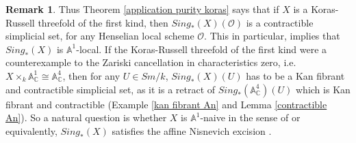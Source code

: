 \documentclass[11pt, reqno]{amsart}
\theoremstyle{plain}
\theoremstyle{definition}
\newtheorem{remark}[thm]{Remark}
\newcommand{\A}{{\mathbb A}}
\newcommand{\C}{{\mathbb C}}
\begin{document}


\begin{remark}
Thus Theorem \ref{application purity koras} says that if $X$ is a Koras-Russell threefold of the first kind, then $Sing_*(X)(\mathcal{O})$ is a contractible  simplicial set, for any Henselian local scheme $\mathcal{O}$.
This in particular, implies that $Sing_*(X)$
is $\mathbb{A}^1$-local.
If the Koras-Russell threefold of the first kind were a counterexample to the Zariski cancellation in characteristics zero, i.e. $X \times_k \mathbb{A}^1_\C \cong \mathbb{A}^4_\C$, then for any $U \in Sm/k$, $Sing_*(X)(U)$ has to be a Kan fibrant and contractible simplicial set, as it is a retract of $Sing_*(\A^4_\C)(U)$ which is Kan fibrant and contractible (Example \ref{kan fibrant An} and Lemma \ref{contractible An}). So a natural question is whether $X$ is $\mathbb{A}^1$-naive in the sense of \cite[Definition 2.1.1]{asokII} or equivalently, $Sing_*(X)$ satisfies the affine Nisnevich excision \cite[Section 2.1]{asokI}.
\end{remark}




\end{document}
